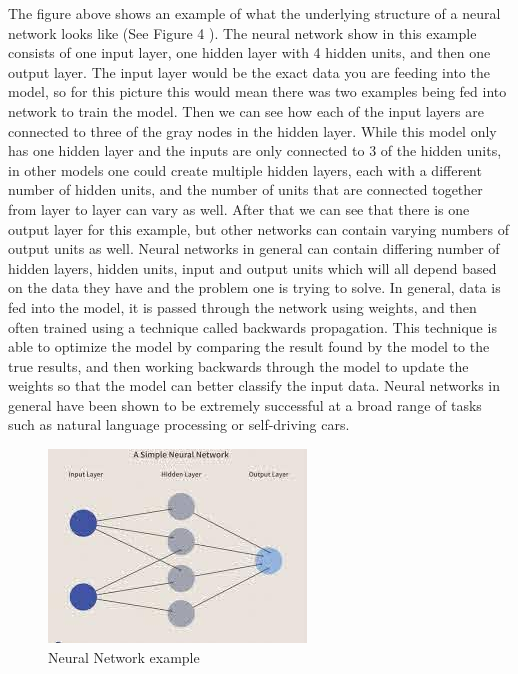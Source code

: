 \documentclass[12pt]{article}
\begin{document}
The figure above shows an example of what the underlying structure of a
neural network looks like (See Figure 4 \citet{Investopedia}). The
neural network show in this example consists of one input layer, one
hidden layer with 4 hidden units, and then one output layer. The input
layer would be the exact data you are feeding into the model, so for
this picture this would mean there was two examples being fed into
network to train the model. Then we can see how each of the input layers
are connected to three of the gray nodes in the hidden layer. While this
model only has one hidden layer and the inputs are only connected to 3
of the hidden units, in other models one could create multiple hidden
layers, each with a different number of hidden units, and the number of
units that are connected together from layer to layer can vary as well.
After that we can see that there is one output layer for this example,
but other networks can contain varying numbers of output units as well.
Neural networks in general can contain differing number of hidden
layers, hidden units, input and output units which will all depend based
on the data they have and the problem one is trying to solve. In
general, data is fed into the model, it is passed through the network
using weights, and then often trained using a technique called backwards
propagation. This technique is able to optimize the model by comparing
the result found by the model to the true results, and then working
backwards through the model to update the weights so that the model can
better classify the input data. Neural networks in general have been
shown to be extremely successful at a broad range of tasks such as
natural language processing or self-driving cars.

\begin{figure}

{\centering \includegraphics[width=0.75\linewidth,height=0.25\textheight]{images/neural_net} 

}

\caption{Neural Network example}\label{fig:sample-fig5}
\end{figure}
\end{document}
